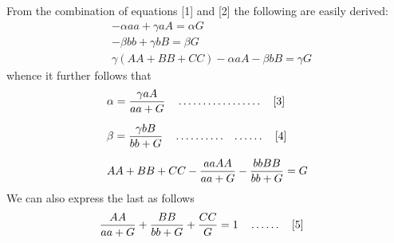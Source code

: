 From the combination of equations [1] and [2] the following are easily derived:
\[
\begin{aligned}
&-\alpha aa+\gamma aA=\alpha G\\[6pt]
&-\beta bb+\gamma bB=\beta G\\[6pt]
&\gamma(AA+BB+CC)-\alpha aA-\beta bB=\gamma G
\end{aligned}
\]
whence it further follows that
\[
\begin{aligned}
&\alpha=\frac{\gamma aA}{aa+G}\quad\mathinner{.\,.\,.\,.\,.\,.\,.\,.\,.\,.\,.\,.\,.\,.\,.\,.\,.}\quad\text{[3]}\\[6pt]
&\beta=\frac{\gamma bB}{bb+G}\quad\mathinner{.\,.\,.\,.\,.\,.\,.\,.\,.\,.\quad.\,.\,.\,.\,.\,.}\quad\text{[4]}\\[6pt]
&AA+BB+CC-\frac{aaAA}{aa+G}-\frac{bbBB}{bb+G}=G
\end{aligned}
\]
We can also express the last as follows
\[
\begin{aligned}
&\frac{AA}{aa+G}+\frac{BB}{bb+G}+\frac{CC}{G}=1\quad\mathinner{.\,.\,.\,.\,.\,.}\quad\text{[5]}
\end{aligned}
\]

